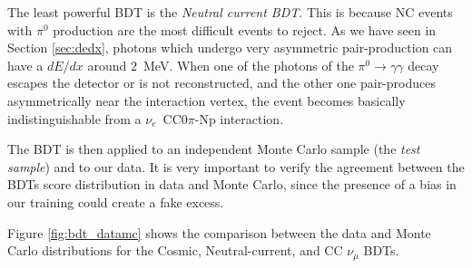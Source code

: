 The least powerful BDT is the \emph{Neutral current BDT}. This is because NC events with $\pi^0$ production are the most difficult events to reject. As we have seen in Section \ref{sec:dedx}, photons which undergo very asymmetric pair-production can have a $dE/dx$ around $2$~MeV. When one of the photons of the $\pi^0\rightarrow\gamma\gamma$ decay escapes the detector or is not reconstructed, and the other one pair-produces asymmetrically near the interaction vertex, the event becomes basically indistinguishable from a $\nu_e$~CC0$\pi$-Np interaction.

The BDT is then applied to an independent Monte Carlo sample (the \emph{test sample}) and to our data. It is very important to verify the agreement between the BDTs score distribution in data and Monte Carlo, since the presence of a bias in our training could create a fake excess.

Figure \ref{fig:bdt_datamc} shows the comparison between the data and Monte Carlo distributions for the Cosmic, Neutral-current, and CC $\nu_{\mu}$ BDTs. 

